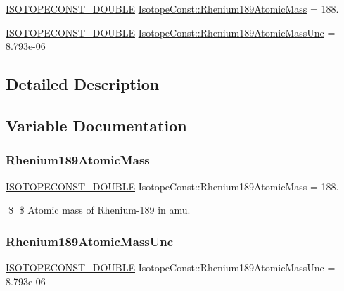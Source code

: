 \begin{DoxyCompactItemize}
\item 
\mbox{\hyperlink{group___isotope_const-_macros_ga8f45a7272ce02c0b4c65c44636ed719a}{I\+S\+O\+T\+O\+P\+E\+C\+O\+N\+S\+T\+\_\+\+D\+O\+U\+B\+LE}} \mbox{\hyperlink{group___isotope_const-_rhenium-_re189_gae4ff5142e65d5e6a02b0425bf6f1db90}{Isotope\+Const\+::\+Rhenium189\+Atomic\+Mass}} = 188.
\item 
\mbox{\hyperlink{group___isotope_const-_macros_ga8f45a7272ce02c0b4c65c44636ed719a}{I\+S\+O\+T\+O\+P\+E\+C\+O\+N\+S\+T\+\_\+\+D\+O\+U\+B\+LE}} \mbox{\hyperlink{group___isotope_const-_rhenium-_re189_ga6d7bf9e860aeaa73f688dcbe6b84fe48}{Isotope\+Const\+::\+Rhenium189\+Atomic\+Mass\+Unc}} = 8.\+793e-\/06
\end{DoxyCompactItemize}


\subsection{Detailed Description}


\subsection{Variable Documentation}
\mbox{\label{group___isotope_const-_rhenium-_re189_gae4ff5142e65d5e6a02b0425bf6f1db90}} 
\subsubsection{\texorpdfstring{Rhenium189\+Atomic\+Mass}{Rhenium189AtomicMass}}
{\footnotesize\ttfamily \mbox{\hyperlink{group___isotope_const-_macros_ga8f45a7272ce02c0b4c65c44636ed719a}{I\+S\+O\+T\+O\+P\+E\+C\+O\+N\+S\+T\+\_\+\+D\+O\+U\+B\+LE}} Isotope\+Const\+::\+Rhenium189\+Atomic\+Mass = 188.}

\$ \$ Atomic mass of Rhenium-\/189 in amu. \mbox{\label{group___isotope_const-_rhenium-_re189_ga6d7bf9e860aeaa73f688dcbe6b84fe48}} 
\subsubsection{\texorpdfstring{Rhenium189\+Atomic\+Mass\+Unc}{Rhenium189AtomicMassUnc}}
{\footnotesize\ttfamily \mbox{\hyperlink{group___isotope_const-_macros_ga8f45a7272ce02c0b4c65c44636ed719a}{I\+S\+O\+T\+O\+P\+E\+C\+O\+N\+S\+T\+\_\+\+D\+O\+U\+B\+LE}} Isotope\+Const\+::\+Rhenium189\+Atomic\+Mass\+Unc = 8.\+793e-\/06}

